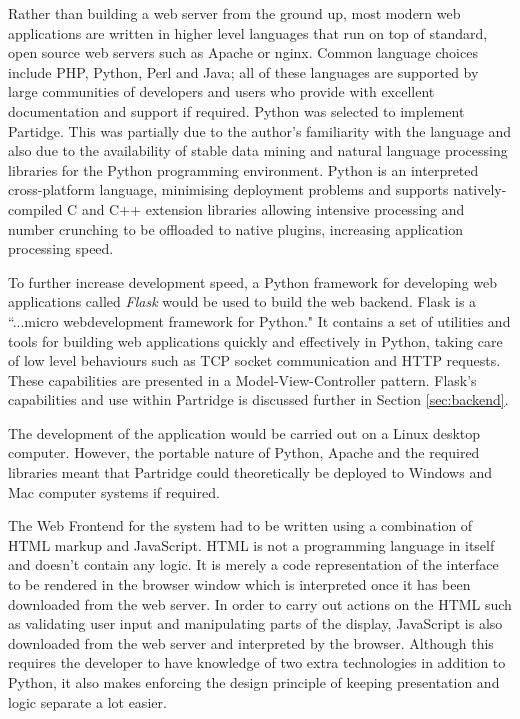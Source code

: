 Rather than building a web server from the ground up, most modern web
applications are written in higher level languages that run on top of standard,
open source web servers such as Apache or nginx. Common language choices
include PHP, Python, Perl and Java; all of these languages are supported by large
communities of developers and users who provide with excellent documentation
and support if required.  Python was
selected to implement Partidge. This was partially due to the
author's familiarity with the language and also due to the availability of
stable data mining\cite{curk05} and natural language
processing\cite{bird2009natural} libraries for the Python programming
environment. Python is an interpreted cross-platform language, minimising
deployment problems and supports natively-compiled C and C++ extension
libraries allowing intensive processing  and number crunching to be offloaded
to native plugins, increasing application processing speed.

To further increase development speed, a Python framework for developing web
applications called \emph{Flask} would be used to build the web backend. Flask
is a ``...micro webdevelopment framework for Python.\cite{flask2012}" It
contains a set of utilities and tools for building web applications quickly and
effectively in Python, taking care of low level behaviours such as TCP socket
communication and HTTP requests. These capabilities are presented in a
Model-View-Controller pattern. Flask's capabilities and use within Partridge is
discussed further in Section \ref{sec:backend}.

The development of the application would be carried out on a Linux desktop
computer. However, the portable nature of Python, Apache and the required
libraries meant that Partridge could theoretically be deployed to Windows and
Mac computer systems if required.

The Web Frontend for the system had to be written using a combination of
HTML markup and JavaScript. HTML is not a programming language in itself and
doesn't contain any logic. It is merely a code representation of the interface
to be rendered in the browser window which is interpreted once it has been
downloaded from the web server. In order to carry out actions on the HTML such
as validating user input and manipulating parts of the display, JavaScript is
also downloaded from the web server and interpreted by the browser. Although
this requires the developer to have knowledge of two extra technologies in addition to Python, it also makes enforcing the design principle of keeping presentation
and logic separate a lot easier.

